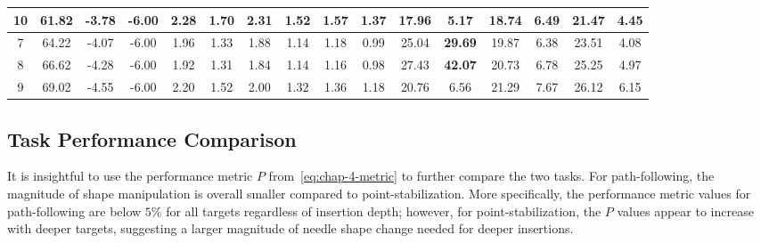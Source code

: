 \begin{table}[]
{\begin{tabular}{cccc|cccccc|cccccc|}
\multicolumn{1}{|c|}{10} & \multicolumn{1}{c|}{61.82} & \multicolumn{1}{c|}{-3.78} & -6.00 & \multicolumn{1}{c|}{2.28} & \multicolumn{1}{c|}{1.70} & \multicolumn{1}{c|}{2.31} & \multicolumn{1}{c|}{1.52} & \multicolumn{1}{c|}{1.57} & 1.37 & \multicolumn{1}{c|}{17.96} & \multicolumn{1}{c|}{5.17} & \multicolumn{1}{c|}{18.74} & \multicolumn{1}{c|}{6.49} & \multicolumn{1}{c|}{21.47} & 4.45 \\ \hline
\multicolumn{1}{|c|}{7} & \multicolumn{1}{c|}{64.22} & \multicolumn{1}{c|}{-4.07} & -6.00 & \multicolumn{1}{c|}{1.96} & \multicolumn{1}{c|}{1.33} & \multicolumn{1}{c|}{1.88} & \multicolumn{1}{c|}{1.14} & \multicolumn{1}{c|}{1.18} & 0.99 & \multicolumn{1}{c|}{25.04} & \multicolumn{1}{c|}{\textbf{29.69}} & \multicolumn{1}{c|}{19.87} & \multicolumn{1}{c|}{6.38} & \multicolumn{1}{c|}{23.51} & 4.08 \\ \hline
\multicolumn{1}{|c|}{8} & \multicolumn{1}{c|}{66.62} & \multicolumn{1}{c|}{-4.28} & -6.00 & \multicolumn{1}{c|}{1.92} & \multicolumn{1}{c|}{1.31} & \multicolumn{1}{c|}{1.84} & \multicolumn{1}{c|}{1.14} & \multicolumn{1}{c|}{1.16} & 0.98 & \multicolumn{1}{c|}{27.43} & \multicolumn{1}{c|}{\textbf{42.07}} & \multicolumn{1}{c|}{20.73} & \multicolumn{1}{c|}{6.78} & \multicolumn{1}{c|}{25.25} & 4.97 \\ \hline
\multicolumn{1}{|c|}{9} & \multicolumn{1}{c|}{69.02} & \multicolumn{1}{c|}{-4.55} & -6.00 & \multicolumn{1}{c|}{2.20} & \multicolumn{1}{c|}{1.52} & \multicolumn{1}{c|}{2.00} & \multicolumn{1}{c|}{1.32} & \multicolumn{1}{c|}{1.36} & 1.18 & \multicolumn{1}{c|}{20.76} & \multicolumn{1}{c|}{6.56} & \multicolumn{1}{c|}{21.29} & \multicolumn{1}{c|}{7.67} & \multicolumn{1}{c|}{26.12} & 6.15 \\ \hline
\end{tabular}%
}
\end{table}

\subsection{Task Performance Comparison}
\label{sec:task_performance_comparison}
It is insightful to use the performance metric $P$ from~\cref{eq:chap-4-metric} to further compare the two tasks. For path-following, the magnitude of shape manipulation is overall smaller compared to point-stabilization. More specifically, the performance metric values for path-following are below $5\%$ for all targets regardless of insertion depth; however, for point-stabilization, the $P$ values appear to increase with deeper targets, suggesting a larger magnitude of needle shape change needed for deeper insertions.

